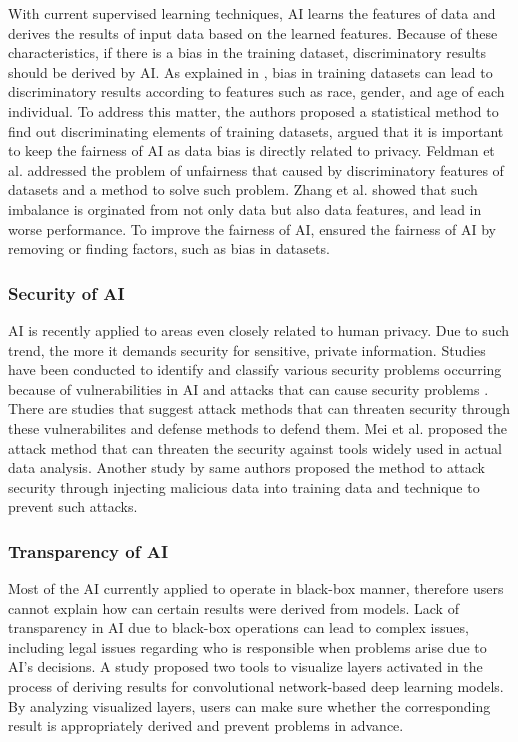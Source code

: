 \documentclass[symmetry,article,submit,moreauthors,pdftex]{Definitions/mdpi}
\begin{document}
With current supervised learning techniques, AI learns the features of data and derives the results of input data based on the learned features.
Because of these characteristics, if there is a bias in the training dataset, discriminatory results should be derived by AI.
As explained in \cite{fairness-dwork, fairness-zemel}, bias in training datasets can lead to discriminatory results according to features such as race, gender, and age of each individual.
To address this matter, the authors proposed a statistical method to find out  discriminating elements of training datasets, argued that it is important to keep the fairness of AI as data bias is directly related to privacy.
Feldman et al. \cite{fairness-feldman} addressed the problem of unfairness that caused by discriminatory features of datasets  and a method to solve such problem.
Zhang et al. \cite{fairness-zhang} showed that such imbalance is orginated from not only data but also data features, and lead in worse performance.
To improve the fairness of AI, \cite{fairness-feldman,fairness-microsoft, fairness-tramer} ensured the fairness of AI by removing or finding factors, such as bias in datasets.

\subsubsection{Security of AI}

AI is recently applied to areas even closely related to human privacy.
Due to such trend, the more it demands security for sensitive, private information.
Studies have been conducted to identify and classify various security problems occurring because of vulnerabilities in AI and attacks that can cause security problems \cite{security-barreno}.
There are studies that suggest attack methods that can threaten security through these vulnerabilites and defense methods to defend them.
Mei et al. \cite{security-mei2} proposed the attack method that can threaten the security against tools widely used in actual data analysis.
Another study by same authors \cite{security-mei} proposed the method to attack security through injecting malicious data into training data and technique to prevent such attacks.

\subsubsection{Transparency of AI}

Most of the AI currently applied to operate in black-box manner, therefore users cannot explain how can certain results were derived from models.
Lack of transparency in AI due to black-box operations can lead to complex issues, including legal issues regarding who is responsible when problems arise due to AI's decisions.
A study \cite{transparency-yosinski} proposed two tools to visualize layers activated in the process of deriving results for convolutional network-based deep learning models.
By analyzing visualized layers, users can make sure whether the corresponding result is appropriately derived and prevent problems in advance.
\end{document}
